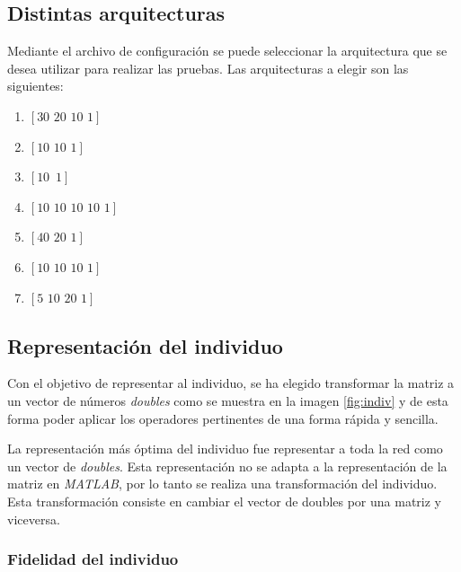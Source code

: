 \documentclass{sig-alternate}
\begin{document}
	\subsection{Distintas arquitecturas}

	Mediante el archivo de configuración se puede seleccionar la arquitectura que se desea utilizar para realizar las pruebas. Las arquitecturas a elegir son las siguientes:

	\begin{center}
		\begin{enumerate}
			\item $[30\,\,20\,\,10\,\,1]$
			\item $[10\,\,10\,\,1]$
			\item $[10\,\,\,1]$
			\item $[10\,\,10\,\,10\,\,10\,\,1]$
			\item $[40\,\,20\,\,1]$
			\item $[10\,\,10\,\,10\,\,1]$
			\item $[5\,\,10\,\,20\,\,1]$
		\end{enumerate}
	\end{center}

	\subsection{Representación del individuo}
Con el objetivo de representar al individuo, se ha elegido transformar la matriz a un vector de números  \textit{doubles} como se muestra en la imagen \ref{fig:indiv} y de esta forma poder aplicar los operadores  pertinentes de una forma rápida y sencilla.

	La representación más óptima del individuo fue representar a toda la red como un vector de \textit{doubles}. Esta representación no se adapta a la representación de la matriz en \textit{MATLAB}, por lo tanto se realiza una transformación del individuo. Esta transformación consiste en cambiar el vector de doubles por una matriz y viceversa.

	\subsubsection{Fidelidad del individuo}
\end{document}
